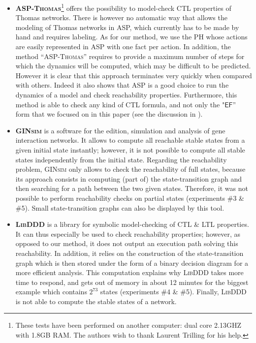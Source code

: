\begin{itemize}

\item \textbf{\textsc{ASP-Thomas}}\footnote{These tests have been performed on another computer: dual core 2.13GHZ with 1.8GB RAM. The authors wish to thank Laurent Trilling for his help.}
offers the possibility to model-check CTL properties of Thomas networks. 
There is however no automatic way that allows the modeling of Thomas networks in ASP, which currently has to be made by hand and requires labeling. As for our method, we use the PH whose actions are easily represented in ASP with one fact per action.
In addition, the method ``\textsc{ASP-Thomas}'' requires to provide a maximum number of steps
for which the dynamics will be computed, which may be difficult to be predicted.
However it is clear that this approach terminates very quickly when compared with others.
Indeed it also shows that ASP is a good choice to run the dynamics of a model and check reachability properties.
Furthermore, this method is able to check any kind of CTL formula,
and not only the "$\mathsf{EF}$'' form that we focused on in this paper
(see the discussion in ).

\item \textbf{\textsc{GINsim}} is a software for the edition, simulation and analysis
of gene interaction networks.
It allows to compute all reachable stable states from a given initial state instantly;
however, it is not possible to compute all stable states independently from the initial state.
Regarding the reachability problem, \textsc{GINsim} only allows to check the reachability of
full states, because its approach consists in computing
(part of) the state-transition graph and then searching for a path between the two given states.
Therefore, it was not possible to perform reachability checks on partial states
(experiments \#3 \& \#5).
Small state-transition graphs can also be displayed by this tool.

\item \textbf{\textsc{LibDDD}}
is a library for symbolic model-checking of CTL \& LTL properties.
It can thus especially be used to check reachability properties;
however, as opposed to our method, it does not output an execution path
solving this reachability.
In addition, it relies on the construction of the state-transition graph
which is then stored under the form of a binary decision diagram for a more efficient analysis.
This computation explains why \textsc{LibDDD} takes more time to respond,
and gets out of memory in about 12 minutes for the biggest example
which contains $2^{73}$ states
(experiments \#4 \& \#5).
Finally, \textsc{LibDDD} is not able to compute the stable states of a network.


\end{itemize}
